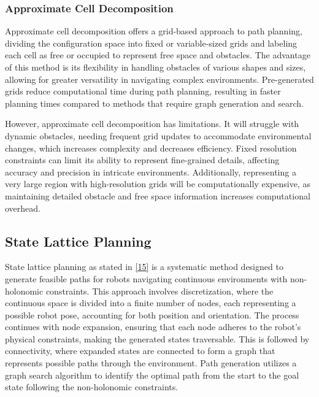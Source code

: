 \subsubsection{Approximate Cell Decomposition}


Approximate cell decomposition offers a grid-based approach to path planning, dividing the configuration space into fixed or variable-sized grids and labeling each cell as free or occupied to represent free space and obstacles. The advantage of this method is its flexibility in handling obstacles of various shapes and sizes, allowing for greater versatility in navigating complex environments. Pre-generated grids reduce computational time during path planning, resulting in faster planning times compared to methods that require graph generation and search.

\vspace*{6mm}

However, approximate cell decomposition has limitations. It will struggle with dynamic obstacles, needing frequent grid updates to accommodate environmental changes, which increases complexity and decreases efficiency. Fixed resolution constraints can limit its ability to represent fine-grained details, affecting accuracy and precision in intricate environments. Additionally, representing a very large region with high-resolution grids will be computationally expensive, as maintaining detailed obstacle and free space information increases computational overhead.

\vspace*{6mm}

\subsection{State Lattice Planning}
State lattice planning as stated in \hyperlink{cite.state_lattice}{[15]} is a systematic method designed to generate feasible paths for robots navigating continuous environments with non-holonomic constraints. This approach involves discretization, where the continuous space is divided into a finite number of nodes, each representing a possible robot pose, accounting for both position and orientation. The process continues with node expansion, ensuring that each node adheres to the robot's physical constraints, making the generated states traversable. This is followed by connectivity, where expanded states are connected to form a graph that represents possible paths through the environment. Path generation utilizes a graph search algorithm to identify the optimal path from the start to the goal state following the non-holonomic constraints.

